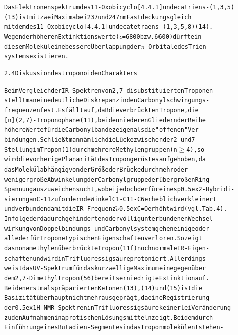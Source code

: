 \documentclass[a4paper,11pt]{article}
\begin{document}
\begin{alltt}
\newpage
{}


Das Elektronenspektrum des 11-Oxobicyclo[4.4.1]undecatriens-(1‚3,5)
(13) ist mit zwei Maxima bei 237 und 247 nm Fast deckungsgleich
mit dem des 11-Oxobicyclo[4.4.1]undecatetraens-(1‚3,5,8) (14).
Wegen der höheren Extinktionswerte (\(\epsilon\) = 6800 bzw. 6600) dürfte in
diesem Molekül eine bessere Überlappung der \(\pi\)-Orbitale des Trien-
systems existieren.

2.4 Diskussion des troponoiden Charakters

Beim Vergleich der IR-Spektren von 2,7-disubstituierten Troponen
stellt man eine deutliche Diskrepanz in den Carbonylschwingungs-
frequenzen fest. Es fällt auf, daB die verbrückten Tropone, die
[n](2,7)-Troponophane (11), bei den niederen Gliedern der Reihe
höhere Werte für die Carbonylbande zeigen als die "offenen" Ver-
bindungen. Schließt man nämlich die Lücke zwischen der 2- und 7-
Stellung im Tropon (1) durch mehrere Methylengruppen (n\(\geq\)4), so
wird die vorherige Planarität des Tropongerüstes aufgehoben, da
das Molekül abhängig von der Größe der Brücke durch mehr oder
weniger große Abwinkelung der Carbonylgruppe der übergroßen Ring-
Spannung auszuweichen sucht, wobei jedoch der für eine sp\raise0.5ex\hbox{2}-Hybridi-
sierung an C-11 zu fordernde Winkel C1-C11-C6 erheblich verkleinert
und verbunden damit die IR-Frequenz \(\tilde{\nu}\)\lower0.5ex\hbox{C=O} erhöht wird (vgl. Tab. 4).
Infolge der dadurch gehinderten oder völlig unterbundenen Wechsel-
wirkung von Doppelbindungs- und Carbonylsystem gehen einige oder
alle der für Tropone typischen Eigenschaften verloren. So zeigt
das nonamethylenüberbrückte Tropon (11f) noch normale IR-Eigen-
schaften und wird in Trifluoressigsäure protoniert. Allerdings
weist das UV-Spektrum für das kurzwellige Maximum eine gegenüber
dem 2,7-Dimethyltropon (56) bereits erniedrigte Extinktion auf.
Bei den erstmals präparierten Ketonen (13), (14) und (15) ist die
Basizität überhaupt nicht mehr ausgeprägt, da eine Registrierung
der \raise0.5ex\hbox{1}H-NMR-Spektren in Trifluoressigsäure keinerlei Veränderung
zu den Aufnahmen in aprotischen Lösungsmitteln zeigt. Bei dem durch
Einführung eines Butadien-Segmentes in das Troponmolekül entstehen-
\newpage
{}
\end{alltt}
\end{document}
